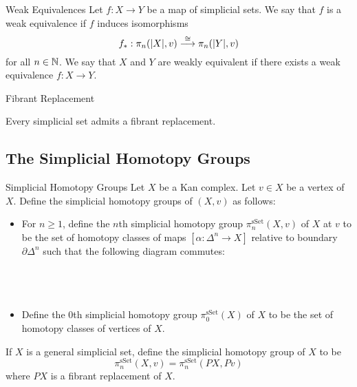 \documentclass[a4paper]{article}
\begin{document}
\begin{defn}{Weak Equivalences}{} Let $f:X\to Y$ be a map of simplicial sets. We say that $f$ is a weak equivalence if $f$ induces isomorphisms $$f_\ast:\pi_n(\abs{X},v)\overset{\cong}{\longrightarrow}\pi_n(\abs{Y},v)$$ for all $n\in\mathbb{N}$. We say that $X$ and $Y$ are weakly equivalent if there exists a weak equivalence $f:X\to Y$. 
\end{defn}

\begin{defn}{Fibrant Replacement}{}
\end{defn}

\begin{thm}{}{} Every simplicial set admits a fibrant replacement. 
\end{thm}

\subsection{The Simplicial Homotopy Groups}
\begin{defn}{Simplicial Homotopy Groups}{} Let $X$ be a Kan complex. Let $v\in X$ be a vertex of $X$. Define the simplicial homotopy groups of $(X,v)$ as follows: 
\begin{itemize}
\item For $n\geq 1$, define the $n$th simplicial homotopy group $\pi_n^\text{sSet}(X,v)$ of $X$ at $v$ to be the set of homotopy classes of maps $[\alpha:\Delta^n\to X]$ relative to boundary $\partial\Delta^n$ such that the following diagram commutes: \\~\\
\\~\\
\item Define the $0$th simplicial homotopy group $\pi_0^\text{sSet}(X)$ of $X$ to be the set of homotopy classes of vertices of $X$. 
\end{itemize}
If $X$ is a general simplicial set, define the simplicial homotopy group of $X$ to be $$\pi_n^\text{sSet}(X,v)=\pi_n^\text{sSet}(PX,Pv)$$ where $PX$ is a fibrant replacement of $X$. 
\end{defn}
\end{document}
